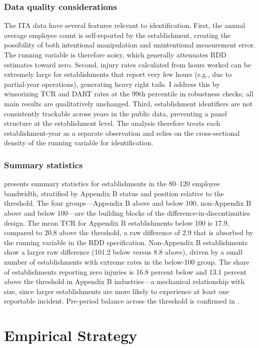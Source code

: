 \documentclass[12pt]{article}
\begin{document}
\subsubsection*{Data quality considerations} The ITA data have several features relevant to identification. First, the annual average employee count is self-reported by the establishment, creating the possibility of both intentional manipulation and unintentional measurement error. The running variable is therefore noisy, which generally attenuates RDD estimates toward zero. Second, injury rates calculated from hours worked can be extremely large for establishments that report very few hours (e.g., due to partial-year operations), generating heavy right tails. I address this by winsorizing TCR and DART rates at the 99th percentile in robustness checks; all main results are qualitatively unchanged. Third, establishment identifiers are not consistently trackable across years in the public data, preventing a panel structure at the establishment level. The analysis therefore treats each establishment-year as a separate observation and relies on the cross-sectional density of the running variable for identification.

\subsubsection*{Summary statistics}  presents summary statistics for establishments in the 80--120 employee bandwidth, stratified by Appendix B status and position relative to the threshold. The four groups---Appendix B above and below 100, non-Appendix B above and below 100---are the building blocks of the difference-in-discontinuities design. The mean TCR for Appendix B establishments below 100 is 17.9, compared to 20.8 above the threshold, a raw difference of 2.9 that is absorbed by the running variable in the RDD specification. Non-Appendix B establishments show a larger raw difference (101.2 below versus 8.8 above), driven by a small number of establishments with extreme rates in the below-100 group. The share of establishments reporting zero injuries is 16.8 percent below and 13.1 percent above the threshold in Appendix B industries---a mechanical relationship with size, since larger establishments are more likely to experience at least one reportable incident. Pre-period balance across the threshold is confirmed in .




\section{Empirical Strategy}\label{sec:design}
\end{document}
